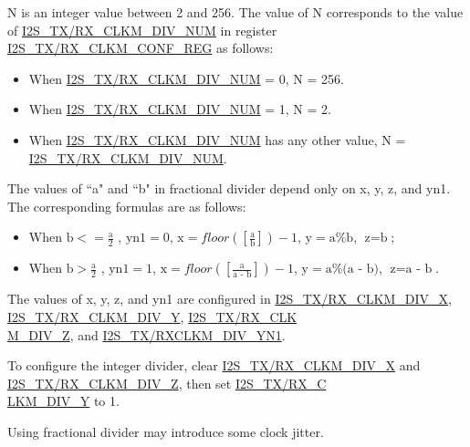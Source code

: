 \documentclass[main\_\_CN.tex]{subfiles}
\begin{document}
N is an integer value between 2 and 256. The value of N corresponds to the value of  \hyperref[fielddesc:I2STXCLKMDIVNUM]{I2S\_TX/RX\_CLKM\_DIV\_NUM} in register  \hyperref[regdesc:I2STXCLKMCONFREG]{I2S\_TX/RX\_CLKM\_CONF\_REG} as follows:

\begin{itemize}
    \item When  \hyperref[fielddesc:I2STXCLKMDIVNUM]{I2S\_TX/RX\_CLKM\_DIV\_NUM} = 0, N = 256.
    \item When  \hyperref[fielddesc:I2STXCLKMDIVNUM]{I2S\_TX/RX\_CLKM\_DIV\_NUM} = 1, N = 2.
    \item When  \hyperref[fielddesc:I2STXCLKMDIVNUM]{I2S\_TX/RX\_CLKM\_DIV\_NUM} has any other value, N =  \hyperref[fielddesc:I2STXCLKMDIVNUM]{I2S\_TX/RX\_CLKM\_DIV\_NUM}.

\end{itemize}

The values of ``a" and ``b" in fractional divider depend only on x, y, z, and yn1. The corresponding formulas are as follows:
\begin{itemize}
    \item When $\textrm{b} <= \frac{\textrm{a}}{2}$ , $\textrm{yn1} = 0$, $\textrm{x} = floor([\frac{\textrm{a}}{\textrm{b}}]) - 1$, $\textrm{y} = \textrm{a}\%\textrm{b}$, $\textrm{z} = \textrm{b}$;
    \item When $\textrm{b} > \frac{\textrm{a}}{2}$ , $\textrm{yn1}=1$, $\textrm{x} = floor([\frac{\textrm{a}}{\textrm{a - b}}]) - 1$, $\textrm{y} = \textrm{a}\%\textrm{(a - b)}$, $\textrm{z}=\textrm{a - b}$.
\end{itemize}

The values of x, y, z, and yn1 are configured in  \hyperref[fielddesc:I2STXCLKMDIVX]{I2S\_TX/RX\_CLKM\_DIV\_X}, \hyperref[fielddesc:I2STXCLKMDIVY]{I2S\_TX/RX\_CLKM\_DIV\_Y}, \hyperref[fielddesc:I2STXCLKMDIVZ]{I2S\_TX/RX\_CLK\\M\_DIV\_Z}, and \hyperref[fielddesc:I2STXCLKMDIVYN1]{I2S\_TX/RXCLKM\_DIV\_YN1}.

To configure the integer divider, clear \hyperref[fielddesc:I2STXCLKMDIVX]{I2S\_TX/RX\_CLKM\_DIV\_X} and  \hyperref[fielddesc:I2STXCLKMDIVZ]{I2S\_TX/RX\_CLKM\_DIV\_Z}, then set \hyperref[fielddesc:I2STXCLKMDIVY]{I2S\_TX/RX\_C\\LKM\_DIV\_Y} to 1.

\begin{tiplisting}
Using fractional divider may introduce some clock jitter.
\end{tiplisting}
\end{document}
